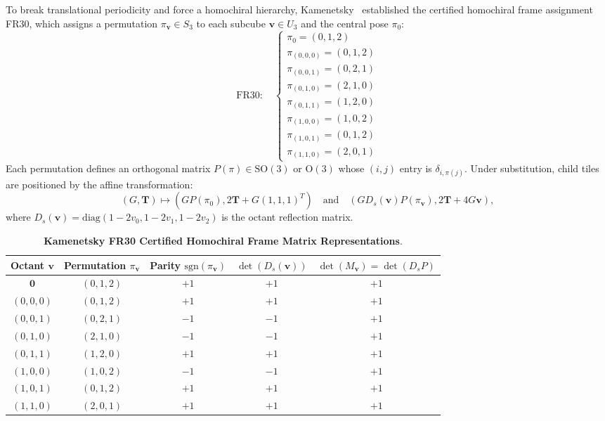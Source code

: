 \documentclass[11pt,a4paper]{article}
\theoremstyle{definition}
\newcommand{\SO}{\mathrm{SO}}
\newcommand{\diag}{\mathrm{diag}}
\begin{document}
To break translational periodicity and force a homochiral hierarchy, Kamenetsky~\cite{Kamenetsky2026} established the certified homochiral frame assignment FR30, which assigns a permutation $\pi_{\mathbf{v}} \in S_3$ to each subcube $\mathbf{v} \in U_3$ and the central pose $\pi_0$:
\begin{equation}
\label{eq:fr30}
\mathrm{FR30}: \quad
\begin{cases}
\pi_0 = (0, 1, 2) \\
\pi_{(0,0,0)} = (0, 1, 2) \\
\pi_{(0,0,1)} = (0, 2, 1) \\
\pi_{(0,1,0)} = (2, 1, 0) \\
\pi_{(0,1,1)} = (1, 2, 0) \\
\pi_{(1,0,0)} = (1, 0, 2) \\
\pi_{(1,0,1)} = (0, 1, 2) \\
\pi_{(1,1,0)} = (2, 0, 1)
\end{cases}
\end{equation}
Each permutation defines an orthogonal matrix $P(\pi) \in \SO(3)$ or $\mathrm{O}(3)$ whose $(i,j)$ entry is $\delta_{i,\pi(j)}$. Under substitution, child tiles are positioned by the affine transformation:
\begin{equation}
(G, \mathbf{T}) \mapsto \left(G P(\pi_0), 2\mathbf{T} + G(1,1,1)^T\right) \quad \text{and} \quad \left(G D_s(\mathbf{v}) P(\pi_{\mathbf{v}}), 2\mathbf{T} + 4G\mathbf{v}\right),
\end{equation}
where $D_s(\mathbf{v}) = \diag(1-2v_0, 1-2v_1, 1-2v_2)$ is the octant reflection matrix.

\begin{table}[h!]
\centering
\small
\caption{\textbf{Kamenetsky FR30 Certified Homochiral Frame Matrix Representations}.}
\label{tab:fr30_matrices}
\begin{tabular}{ccccc}
\toprule
\textbf{Octant $\mathbf{v}$} & \textbf{Permutation $\pi_{\mathbf{v}}$} & \textbf{Parity $\mathrm{sgn}(\pi_{\mathbf{v}})$} & $\det(D_s(\mathbf{v}))$ & $\det(M_{\mathbf{v}}) = \det(D_s P)$ \\
\midrule
$\mathbf{0}$ & $(0, 1, 2)$ & $+1$ & $+1$ & $+1$ \\
$(0, 0, 0)$ & $(0, 1, 2)$ & $+1$ & $+1$ & $+1$ \\
$(0, 0, 1)$ & $(0, 2, 1)$ & $-1$ & $-1$ & $+1$ \\
$(0, 1, 0)$ & $(2, 1, 0)$ & $-1$ & $-1$ & $+1$ \\
$(0, 1, 1)$ & $(1, 2, 0)$ & $+1$ & $+1$ & $+1$ \\
$(1, 0, 0)$ & $(1, 0, 2)$ & $-1$ & $-1$ & $+1$ \\
$(1, 0, 1)$ & $(0, 1, 2)$ & $+1$ & $+1$ & $+1$ \\
$(1, 1, 0)$ & $(2, 0, 1)$ & $+1$ & $+1$ & $+1$ \\
\bottomrule
\end{tabular}
\end{table}
\end{document}
